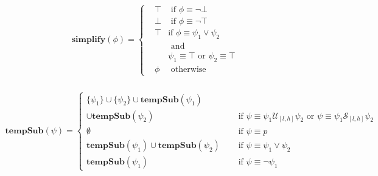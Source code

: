 \documentclass[10pt,a4paper]{article}
\begin{document}
\begin{align*}
\mathbf{simplify}(\phi) = \left\{
\begin{aligned}
&\top &\text{ if } \phi \equiv \neg \bot \\
&\bot &\text{ if } \phi \equiv \neg \top \\
&\top &\text {if } \phi \equiv \psi_1 \vee \psi_2 \\
& &\text{ and } \\ & & \psi_1 \equiv \top \text{ or } \psi_2 \equiv \top \\
&\phi &\text{ otherwise}
\end{aligned} \right. \\
\end{align*}

\begin{align*}
\mathbf{tempSub}(\psi) = \left\lbrace
\begin{aligned}
\{\psi_1\} \cup \{\psi_2\} \cup \mathbf{tempSub}(\psi_1) \\
\cup \mathbf{tempSub}(\psi_2) & \quad \text{ if } \psi \equiv \psi_1 \mathcal{U}_{[l,h]} \psi_2 \text{ or } \psi \equiv \psi_1 \mathcal{S}_{[l,h]} \psi_2 \\
\emptyset & \quad \text{ if } \psi \equiv p \\
\mathbf{tempSub}(\psi_1) \cup \mathbf{tempSub}(\psi_2) & \quad \text{ if } \psi \equiv \psi_1 \vee \psi_2 \\
\mathbf{tempSub}(\psi_1) & \quad \text{ if } \psi \equiv \neg \psi_1
\end{aligned} \right.
\end{align*}
\end{document}
